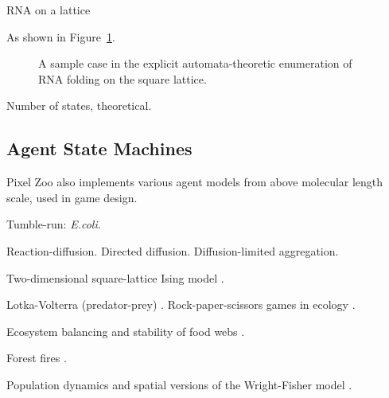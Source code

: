 \documentclass{acm_proc_article-sp}
\begin{document}
RNA on a lattice \cite{LeoniVanderzande2003,JostEveraers2010,ZaraPretti2007,GillespieMayneJiang2009}


As shown in Figure~\ref{fig:rna}.

\begin{figure}
\caption{
\label{fig:rna}
A sample case in the explicit automata-theoretic enumeration of RNA folding on the square lattice.
}
\end{figure}

Number of states, theoretical.


\subsection{Agent State Machines}

Pixel Zoo also implements various agent models from above molecular length scale, used in game design.

Tumble-run: {\em E.coli}.
\cite{RosserEtAl2013}


Reaction-diffusion.
Directed diffusion.
Diffusion-limited aggregation.
\cite{DLA}

Two-dimensional square-lattice Ising model \cite{Onsager1944}.

Lotka-Volterra (predator-prey) \cite{Lotka1910,Hirota199739}.
Rock-paper-scissors games in ecology \cite{Tainaka2000}.

Ecosystem balancing and stability of food webs \cite{quince2005topological}.

Forest fires \cite{Karafyllidis1997}.

Population dynamics and spatial versions of the Wright-Fisher model \cite{MathiesonMcVean2013}.
\end{document}
